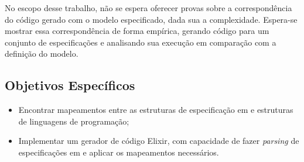 No escopo desse trabalho, não se espera oferecer provas sobre a correspondência
do código gerado com o modelo especificado, dada sua a complexidade. Espera-se
mostrar essa correspondência de forma empírica, gerando código para um conjunto
de especificações e analisando sua execução em comparação com a definição do modelo.

\subsection{Objetivos Específicos}
\begin{itemize}
  \item Encontrar mapeamentos entre as estruturas de especificação em \TLA e estruturas de linguagens de programação;
  \item Implementar um gerador de código Elixir, com capacidade de fazer \textit{parsing} de especificações em \TLA e aplicar os mapeamentos necessários.
\end{itemize}
